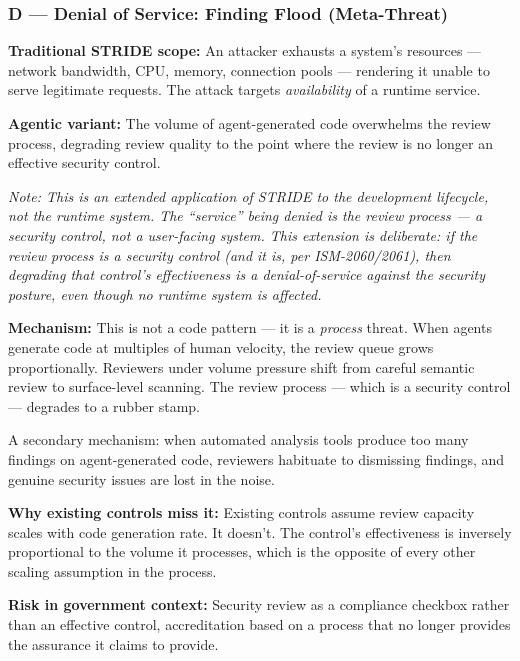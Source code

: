 \documentclass[a4paper,11pt]{report}
\begin{document}
\hypertarget{d-denial-of-service-finding-flood-meta-threat}{%
\subsubsection{D --- Denial of Service: Finding Flood
(Meta-Threat)}\label{d-denial-of-service-finding-flood-meta-threat}}

\textbf{Traditional STRIDE scope:} An attacker exhausts a system's
resources --- network bandwidth, CPU, memory, connection pools ---
rendering it unable to serve legitimate requests. The attack targets
\emph{availability} of a runtime service.

\textbf{Agentic variant:} The volume of agent-generated code overwhelms
the review process, degrading review quality to the point where the
review is no longer an effective security control.

\emph{Note: This is an extended application of STRIDE to the development
lifecycle, not the runtime system. The ``service'' being denied is the
review process --- a security control, not a user-facing system. This
extension is deliberate: if the review process is a security control
(and it is, per ISM-2060/2061), then degrading that control's
effectiveness is a denial-of-service against the security posture, even
though no runtime system is affected.}

\textbf{Mechanism:} This is not a code pattern --- it is a
\emph{process} threat. When agents generate code at multiples of human
velocity, the review queue grows proportionally. Reviewers under volume
pressure shift from careful semantic review to surface-level scanning.
The review process --- which is a security control --- degrades to a
rubber stamp.

A secondary mechanism: when automated analysis tools produce too many
findings on agent-generated code, reviewers habituate to dismissing
findings, and genuine security issues are lost in the noise.

\textbf{Why existing controls miss it:} Existing controls assume review
capacity scales with code generation rate. It doesn't. The control's
effectiveness is inversely proportional to the volume it processes,
which is the opposite of every other scaling assumption in the process.

\textbf{Risk in government context:} Security review as a compliance
checkbox rather than an effective control, accreditation based on a
process that no longer provides the assurance it claims to provide.
\end{document}
